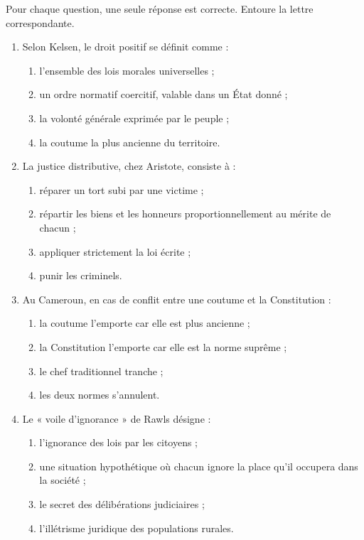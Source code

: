 \documentclass[11pt]{article}
\begin{document}
\begin{exercice}
Pour chaque question, une seule réponse est correcte. Entoure la lettre correspondante.
\begin{enumerate}
\item Selon Kelsen, le droit positif se définit comme :
\begin{enumerate}
\item l'ensemble des lois morales universelles ;
\item un ordre normatif coercitif, valable dans un État donné ;
\item la volonté générale exprimée par le peuple ;
\item la coutume la plus ancienne du territoire.
\end{enumerate}
\item La justice distributive, chez Aristote, consiste à :
\begin{enumerate}
\item réparer un tort subi par une victime ;
\item répartir les biens et les honneurs proportionnellement au mérite de chacun ;
\item appliquer strictement la loi écrite ;
\item punir les criminels.
\end{enumerate}
\item Au Cameroun, en cas de conflit entre une coutume et la Constitution :
\begin{enumerate}
\item la coutume l'emporte car elle est plus ancienne ;
\item la Constitution l'emporte car elle est la norme suprême ;
\item le chef traditionnel tranche ;
\item les deux normes s'annulent.
\end{enumerate}
\item Le « voile d'ignorance » de Rawls désigne :
\begin{enumerate}
\item l'ignorance des lois par les citoyens ;
\item une situation hypothétique où chacun ignore la place qu'il occupera dans la société ;
\item le secret des délibérations judiciaires ;
\item l'illétrisme juridique des populations rurales.
\end{enumerate}
\end{enumerate}
\end{exercice}
\end{document}

